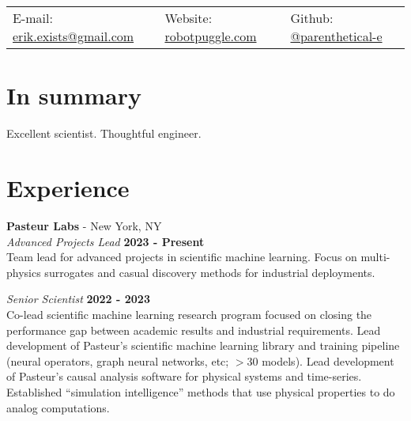\documentclass[margin,line]{res}
\begin{document}
\newcommand{\link}[1]{\texttt{#1}}
\providecommand{\tightlist}{%
    \setlength{\itemsep}{0pt}\setlength{\parskip}{0pt}}



\begin{resume}
\section{\sc }
\vspace{.05in}

\begin{tabular}{@{}p{2in}p{2in}p{2in}}
{E-mail:}  {\href{mailto:erik.exists@gmail.com}{erik.exists@gmail.com}} & {Website:} \href{http://robotpuggle.com}{robotpuggle.com} & {Github:} \href{https://github.com/parenthetical-e/}{@parenthetical-e} \\
\end{tabular}

\vspace{-.2cm}
\section{\sc In summary}
Excellent scientist. Thoughtful engineer. 

\section{\sc Experience}
\vspace{-.1cm}
{\bf Pasteur Labs} - New York, NY\\
{\em Advanced Projects Lead} \hfill {\bf 2023 - Present}\\
Team lead for advanced projects in scientific machine learning. Focus on multi-physics surrogates and casual discovery methods for industrial deployments.

\vspace{-.2cm}
{\em Senior Scientist} \hfill {\bf 2022 - 2023}\\
Co-lead scientific machine learning research program focused on closing the performance gap between academic results and industrial requirements. Lead development of Pasteur's scientific machine learning library and training pipeline (neural operators, graph neural networks, etc; $>$30 models). Lead development of Pasteur's causal analysis software for physical systems and time-series. Established “simulation intelligence” methods that use physical properties to do analog computations.


\end{resume}
\end{document}
